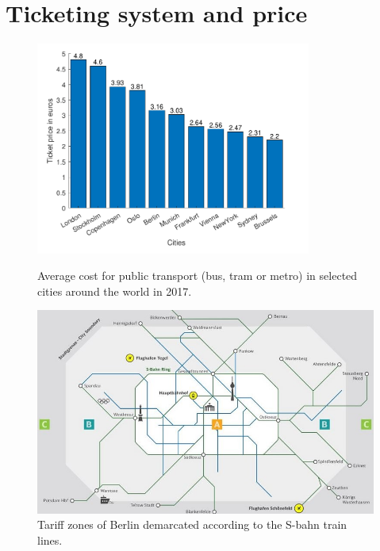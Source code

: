\section{Ticketing system and price}
\begin{figure}[h]
	\begin{minipage}[c]{0.4\linewidth}
		\centering
		\includegraphics[height=7cm]{Images/GraphPricePT.pdf}
		\caption{Average cost for public transport (bus, tram or metro) in selected cities around the world in 2017\cite{pricesPT}.}
		\label{pricePT}
	\end{minipage}\hfill
	\begin{minipage}[c]{0.45\linewidth}
		\centering
		\includegraphics[width=1.1\linewidth]{Images/tariffZones.jpg}
		\caption{Tariff zones of Berlin demarcated according to the S-bahn train lines\cite{tarif}.}
		\label{tariffZones}
	\end{minipage}
\end{figure}
